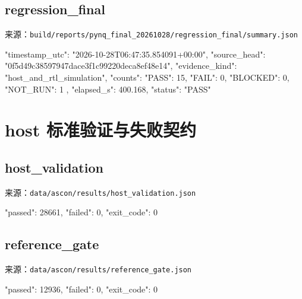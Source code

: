 \Needspace{219pt}

\subsection{regression\_final}\label{regression_final}

来源：\texttt{build/\allowbreak{}reports/\allowbreak{}pynq\_\allowbreak{}final\_\allowbreak{}20261028/\allowbreak{}regression\_\allowbreak{}final/\allowbreak{}summary.\allowbreak{}json}

\begin{codeblock}[samepage=true]
{
  "timestamp_utc": "2026-10-28T06:47:35.854091+00:00",
  "source_head": "0f5d49c38597947dace3f1c99220deca8ef48e14",
  "evidence_kind": "host_and_rtl_simulation",
  "counts": {
    "PASS": 15,
    "FAIL": 0,
    "BLOCKED": 0,
    "NOT_RUN": 1
  },
  "elapsed_s": 400.168,
  "status": "PASS"
}
\end{codeblock}

\Needspace{85pt}

\section{host 标准验证与失败契约}\label{host-ux6807ux51c6ux9a8cux8bc1ux4e0eux5931ux8d25ux5951ux7ea6}

\Needspace{125pt}

\subsection{host\_validation}\label{host_validation}

来源：\texttt{data/\allowbreak{}ascon/\allowbreak{}results/\allowbreak{}host\_\allowbreak{}validation.\allowbreak{}json}

\begin{codeblock}[samepage=true]
{
  "passed": 28661,
  "failed": 0,
  "exit_code": 0
}
\end{codeblock}

\Needspace{125pt}

\subsection{reference\_gate}\label{reference_gate}

来源：\texttt{data/\allowbreak{}ascon/\allowbreak{}results/\allowbreak{}reference\_\allowbreak{}gate.\allowbreak{}json}

\begin{codeblock}[samepage=true]
{
  "passed": 12936,
  "failed": 0,
  "exit_code": 0
}
\end{codeblock}

